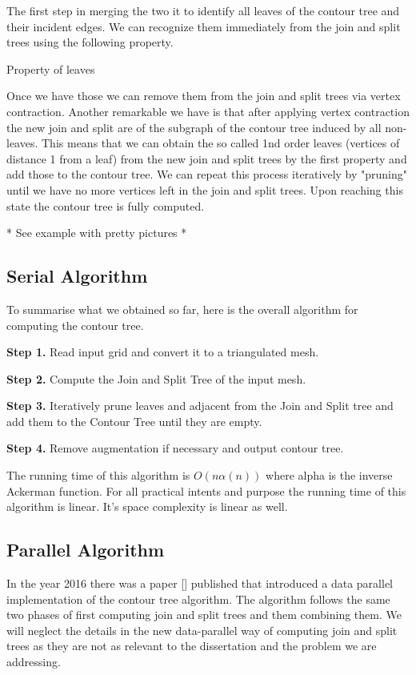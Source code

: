 The first step in merging the two it to identify all leaves of the contour tree and their incident edges. We can recognize them immediately from the join and split trees using the following property.

\begin{defn} Property of leaves   \end{defn}


Once we have those we can remove them from the join and split trees via vertex contraction. Another remarkable we have is that after applying vertex contraction the new join and split are of the subgraph of the contour tree induced by all non-leaves. This means that we can obtain the so called 1nd order leaves (vertices of distance 1 from a leaf) from the new join and split trees by the first property and add those to the contour tree. We can repeat this process iteratively by "pruning" until we have no more vertices left in the join and split trees. Upon reaching this state the contour tree is fully computed.

* See example with pretty pictures *

\subsection{Serial Algorithm}

To summarise what we obtained so far, here is the overall algorithm for computing the contour tree.

\textbf{Step 1.} Read input grid and convert it to a triangulated mesh.

\textbf{Step 2.} Compute the Join and Split Tree of the input mesh.

\textbf{Step 3.} Iteratively prune leaves and adjacent from the Join and Split tree and add them to the Contour Tree until they are empty.

\textbf{Step 4.} Remove augmentation if necessary and output contour tree.

The running time of this algorithm is $O(n\alpha(n))$ where alpha is the inverse Ackerman function. For all practical intents and purpose the running time of this algorithm is linear. It's space complexity is linear as well.

\subsection{Parallel Algorithm}

In the year 2016 there was a paper [] published that introduced a data parallel implementation of the contour tree algorithm. The algorithm follows the same two phases of first computing join and split trees and them combining them. We will neglect the details in the new data-parallel way of computing join and split trees as they are not as relevant to the dissertation and the problem we are addressing.  


